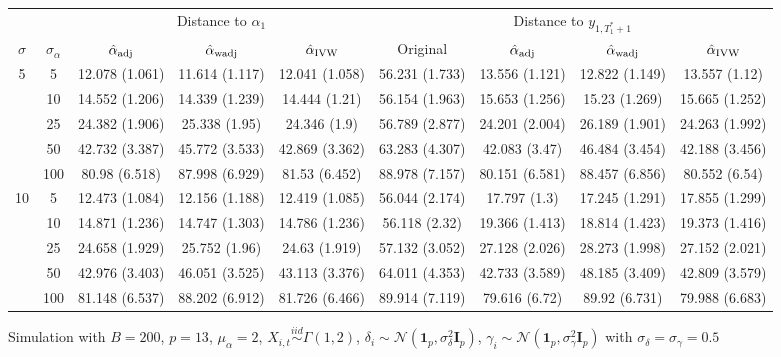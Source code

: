 \documentclass[10pt]{article}
\newcommand{\simiid}{\stackrel{iid}{\sim}} %
\def\normal#1#2{\mathcal{N}(#1,#2)} %
\theoremstyle{definition}
\begin{document}

\begin{sidewaysfigure}
\centering
\caption{Simulation  with $B = 200$, $p = 13$, $\mu_{\alpha}=2$, $X_{i,t} \simiid \Gamma(1,2)$, $\delta_i \sim \normal{\mathbf{1}_p}{\sigma^2_{\delta}\mathbf{I}_p}$, $\gamma_i \sim \normal{\mathbf{1}_p}{\sigma^2_{\gamma}\mathbf{I}_p}$ with $\sigma_{\delta}=\sigma_{\gamma}=0.5$}
\begin{tabular}{cc|ccc|cccc}
  & & \multicolumn{3}{c|}{Distance to $\alpha_1$}  & \multicolumn{4}{c}{Distance to $y_{1, T_1^*+1}$}  \\ 
  $\sigma$   & $\sigma_{\alpha}$ & $\hat{\alpha}_{\rm adj}$  & $\hat{\alpha}_{\rm wadj}$ & $\hat{\alpha}_{\rm IVW}$ & Original & $\hat{\alpha}_{\rm adj}$ & $\hat{\alpha}_{\rm wadj}$ & $\hat{\alpha}_{\rm IVW}$\\[.3cm]  
  \hline
 \multirow{5}{*}{5}  & 5  & 12.078 (1.061) & 11.614 (1.117) & 12.041 (1.058) & 56.231 (1.733) & 13.556 (1.121) & 12.822 (1.149) & 13.557 (1.12) \\ 
    & 10  & 14.552 (1.206) & 14.339 (1.239) & 14.444 (1.21) & 56.154 (1.963) & 15.653 (1.256) & 15.23 (1.269) & 15.665 (1.252) \\ 
    & 25  & 24.382 (1.906) & 25.338 (1.95) & 24.346 (1.9) & 56.789 (2.877) & 24.201 (2.004) & 26.189 (1.901) & 24.263 (1.992) \\ 
   & 50 & 42.732 (3.387) & 45.772 (3.533) & 42.869 (3.362) & 63.283 (4.307) & 42.083 (3.47) & 46.484 (3.454) & 42.188 (3.456) \\ 
    & 100 & 80.98 (6.518) & 87.998 (6.929) & 81.53 (6.452) & 88.978 (7.157) & 80.151 (6.581) & 88.457 (6.856) & 80.552 (6.54)\\[.3cm] 
   \multirow{5}{*}{10}  & 5 & 12.473 (1.084) & 12.156 (1.188) & 12.419 (1.085) & 56.044 (2.174) & 17.797 (1.3) & 17.245 (1.291) & 17.855 (1.299) \\ 
    & 10 & 14.871 (1.236) & 14.747 (1.303) & 14.786 (1.236) & 56.118 (2.32) & 19.366 (1.413) & 18.814 (1.423) & 19.373 (1.416) \\ 
    & 25 & 24.658 (1.929) & 25.752 (1.96) & 24.63 (1.919) & 57.132 (3.052) & 27.128 (2.026) & 28.273 (1.998) & 27.152 (2.021) \\ 
    & 50 & 42.976 (3.403) & 46.051 (3.525) & 43.113 (3.376) & 64.011 (4.353) & 42.733 (3.589) & 48.185 (3.409) & 42.809 (3.579) \\ 
    & 100 & 81.148 (6.537) & 88.202 (6.912) & 81.726 (6.466) & 89.914 (7.119) & 79.616 (6.72) & 89.92 (6.731) & 79.988 (6.683) \\[.3cm] 

\end{tabular}
\end{sidewaysfigure}
\end{document}
